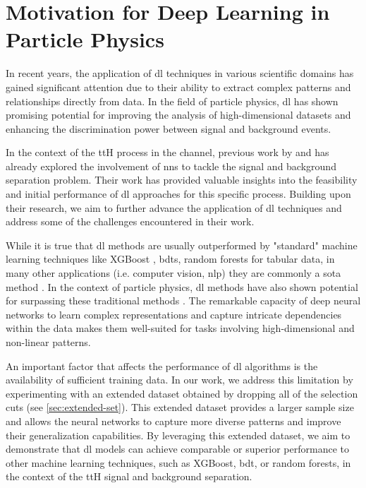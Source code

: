 \section*{Motivation for Deep Learning in Particle Physics}

In recent years, the application of \gls{dl} techniques in various scientific domains has gained significant
attention due to their ability to extract complex patterns and relationships directly from data. In the field of
particle physics, \gls{dl} has shown promising potential for improving the analysis of high-dimensional datasets
and enhancing the discrimination power between signal and background events.

In the context of the ttH process in the \lss channel, previous work by \cite{severin} and \cite{jan} has already
explored the involvement of \glspl{nn} to tackle the signal and background separation problem. Their work has
provided valuable insights into the feasibility and initial performance of \gls{dl} approaches for this specific
process. Building upon their research, we aim to further advance the application of \gls{dl} techniques and address
some of the challenges encountered in their work.

While it is true that \gls{dl} methods are usually outperformed \cite{tabular} by "standard" machine learning techniques
like XGBoost \cite{xgboost}, \glspl{bdt}, random forests \cite{random-forrest} for tabular data, in many other
applications (i.e. computer vision, \gls{nlp}) they are commonly a \gls{sota} method
\cite{gpt4-technical,gpt4-sparks,diffusion}. %
In the context of particle physics, \gls{dl} methods have also shown potential for surpassing these traditional methods
\cite{jet-rnn}.  The remarkable capacity of deep neural networks to learn complex representations and capture intricate
dependencies within the data makes them well-suited for tasks involving high-dimensional and non-linear patterns.

An important factor that affects the performance of \gls{dl} algorithms is the availability of sufficient training data.
In our work, we address this limitation by experimenting with an extended dataset obtained by dropping all of the
selection cuts (see \autoref{sec:extended-set}). This extended dataset provides a larger sample size and allows the
neural networks to capture more diverse patterns and improve their generalization capabilities. By leveraging this
extended dataset, we aim to demonstrate that \gls{dl} models can achieve comparable or superior performance to other
machine learning techniques, such as XGBoost, \gls{bdt}, or random forests, in the context of the ttH signal and
background separation.

